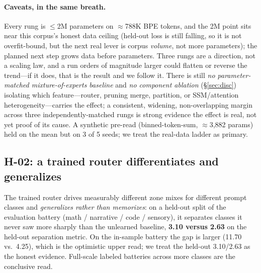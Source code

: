 \documentclass[11pt]{article}
\begin{document}
\paragraph{Caveats, in the same breath.}
Every rung is $\le$2M parameters on $\approx$788K BPE tokens, and the 2M point sits near this corpus's
honest data ceiling (held-out loss is still falling, so it is not overfit-bound, but the next real
lever is corpus \emph{volume}, not more parameters); the planned next step grows data before
parameters. Three rungs are a direction, not a scaling law, and a run orders of magnitude larger
could flatten or reverse the trend---if it does, that is the result and we follow it. There is still
\emph{no parameter-matched mixture-of-experts baseline} and \emph{no component ablation}
(\S\ref{sec:disc}) isolating which feature---router, pruning merge, partition, or SSM/attention
heterogeneity---carries the effect; a consistent, widening, non-overlapping margin across three
independently-matched rungs is strong evidence the effect is real, not yet proof of its cause. A
synthetic pre-read (binned-token-sum, $\approx$3{,}882 params) held on the mean but on 3 of 5 seeds;
we treat the real-data ladder as primary.

\subsection{H-02: a trained router differentiates and generalizes}
The trained router drives measurably different zone mixes for different prompt classes and
\emph{generalizes rather than memorizes}: on a held-out split of the evaluation battery (math /
narrative / code / sensory), it separates classes it never saw more sharply than the unlearned
baseline, \textbf{3.10 versus 2.63} on the held-out separation metric. On the in-sample battery the
gap is larger (11.70 vs.\ 4.25), which is the optimistic upper read; we treat the held-out 3.10/2.63
as the honest evidence. Full-scale labeled batteries across more classes are the conclusive read.
\end{document}
